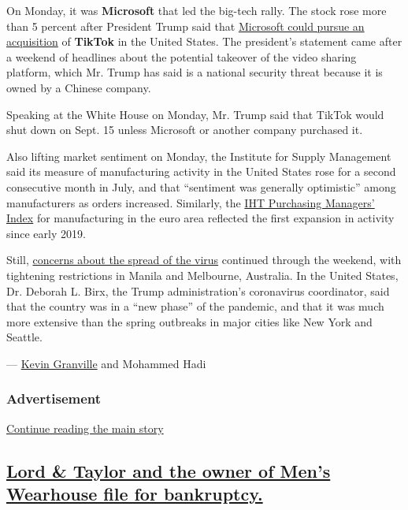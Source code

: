 On Monday, it was \textbf{Microsoft} that led the big-tech rally. The
stock rose more than 5 percent after President Trump said that
\href{https://www.nytimes.com/2020/08/03/technology/trump-tiktok-microsoft.html}{Microsoft
could pursue an acquisition} of \textbf{TikTok} in the United States.
The president's statement came after a weekend of headlines about the
potential takeover of the video sharing platform, which Mr. Trump has
said is a national security threat because it is owned by a Chinese
company.

Speaking at the White House on Monday, Mr. Trump said that TikTok would
shut down on Sept. 15 unless Microsoft or another company purchased it.

Also lifting market sentiment on Monday, the Institute for Supply
Management said its measure of manufacturing activity in the United
States rose for a second consecutive month in July, and that ``sentiment
was generally optimistic'' among manufacturers as orders increased.
Similarly, the
\href{https://www.markiteconomics.com/Public/Home/PressRelease/c4e32989182e4296964138d78fcc1305}{IHT
Purchasing Managers' Index} for manufacturing in the euro area reflected
the first expansion in activity since early 2019.

Still,
\href{https://www.nytimes.com/2020/08/02/world/coronavirus-covid-19.html?action=click\&module=Top\%20Stories\&pgtype=Homepage}{concerns
about the spread of the virus} continued through the weekend, with
tightening restrictions in Manila and Melbourne, Australia. In the
United States, Dr. Deborah L. Birx, the Trump administration's
coronavirus coordinator, said that the country was in a ``new phase'' of
the pandemic, and that it was much more extensive than the spring
outbreaks in major cities like New York and Seattle.

--- \href{https://www.nytimes.com/by/kevin-granville}{Kevin Granville}
and Mohammed Hadi

\hypertarget{advertisement-1}{%
\subsubsection{Advertisement}\label{advertisement-1}}

\protect\hyperlink{after-dfp-ad-mid2}{Continue reading the main story}

\hypertarget{lord--taylor-and-the-owner-of-mens-wearhouse-file-for-bankruptcy}{%
\subsection{\texorpdfstring{\protect\hyperlink{lord-taylor-and-the-owner-of-mens-wearhouse-file-for-bankruptcy}{Lord
\& Taylor and the owner of Men's Wearhouse file for
bankruptcy.}}{Lord \& Taylor and the owner of Men's Wearhouse file for bankruptcy.}}\label{lord--taylor-and-the-owner-of-mens-wearhouse-file-for-bankruptcy}}

